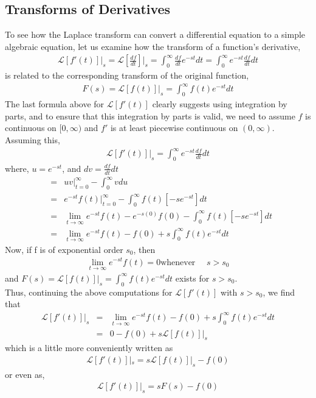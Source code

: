 \documentclass[11pt]{report}
\newcommand{\Laplace}{\mathcal{L}}
\newcommand{\sps}{\\[0.2cm]}
\newcommand{\dsp}{\displaystyle}
\newcommand{\NI}{\noindent}
\begin{document}
	\subsection{Transforms of Derivatives}
	To see how the Laplace transform can convert a differential equation to a simple algebraic equation, let us examine how the transform of a function’s derivative,
	\begin{eqnarray}
		\Laplace [f'(t)]|_{s} = \Laplace \left[\frac{df}{dt}\right]\Bigg|_{s} = \int_{0}^{\infty} \frac{df}{dt} e^{-st}dt = \int_{0}^{\infty} e^{-st} \frac{df}{dt} dt
	\end{eqnarray}
	is related to the corresponding transform of the original function,
	\begin{eqnarray}
		F(s) = \mathcal{L} [f(t)]|_{s} =\int_{0}^{\infty} f(t)e^{-st} dt
	\end{eqnarray}
	The last formula above for $\mathcal{L} [f'(t)]$ clearly suggests using integration by parts, and to ensure
	that this integration by parts is valid, we need to assume $f$ is continuous on $[0,\infty)$ and $f'$ is at least piecewise continuous on $(0,\infty)$. Assuming this,
	\begin{eqnarray}
		\mathcal{L} [f'(t)]|_{s} = \int_{0}^{\infty} e^{-st} \frac{df}{dt} dt
	\end{eqnarray}
	where, $u = e^{-st}$, and $\dsp dv = \frac{df}{dt} dt$
	\begin{eqnarray*}
		&=& uv|_{t = 0}^{\infty} - \int_{0}^{\infty} vdu\sps
		&=& e^{-st} f(t)|_{t=0}^{\infty} - \int_{0}^{\infty} f(t)[-se^{-st}]dt\sps
		&=& \lim_{t \to \infty} e^{-st} f(t) - e^{-s(0)}f(0) - \int_{0}^{\infty} f(t)[-se^{-st}]dt\sps
		&=& \lim_{t \to \infty} e^{-st} f(t) - f(0) + s \int_{0}^{\infty} f(t)e^{-st}dt
	\end{eqnarray*}
	Now, if f is of exponential order $s_0$, then
	\begin{eqnarray*}
		\lim_{t \to \infty} e^{-st} f(t) = 0		\text{whenever} ~~~~~~ s>s_0
	\end{eqnarray*}
	and $\dsp F(s) = \mathcal{L}[f(t)]|_s= \int_{0}^{\infty} f(t)e^{-st}dt$ exists for $s>s_0$.\\
	
	\NI Thus, continuing the above computations for $\mathcal{L}[f'(t)]$ with $s>s_0$, we find that
	\begin{eqnarray*}
		\mathcal{L}[f'(t)]|_s &=& \lim_{t \to \infty} e^{-st} f(t) - f(0) + s\int_{0}^{\infty} f(t)e^{-st}dt\sps
		&=& 0 - f(0) + s\mathcal{L}[f(t)]|_s
	\end{eqnarray*}
	which is a little more conveniently written as
	\begin{eqnarray*}
		\mathcal{L}[f'(t)]|_s = s\mathcal{L}[f(t)]|_s - f(0)
	\end{eqnarray*}
	or even as,
	\begin{eqnarray*}
		\mathcal{L}[f'(t)]|_s = sF(s) - f(0)
	\end{eqnarray*}
	
\end{document}
